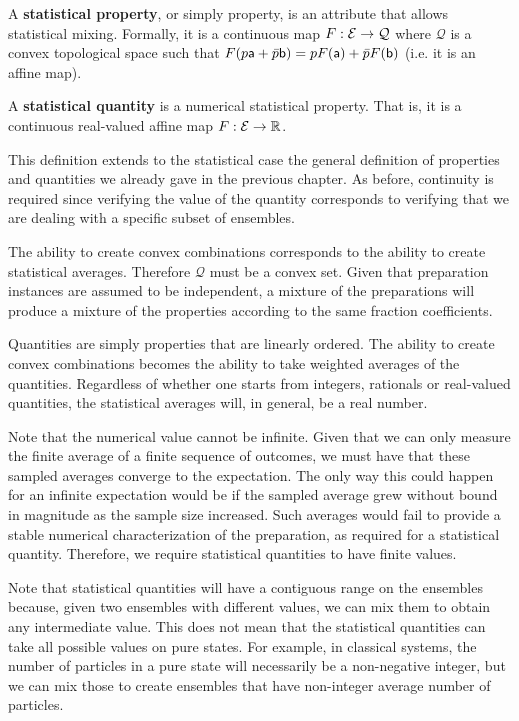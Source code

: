 \begin{mathSection}
	
\begin{defn}
	A \textbf{statistical property}, or simply property, is an attribute that allows statistical mixing. Formally, it is a continuous map $F : \Ens \to \mathcal{Q}$ where $\mathcal{Q}$ is a convex topological space such that $F(p \ens[a] + \bar{p} \ens[b]) = p F(\ens[a]) + \bar{p} F(\ens[b])$ (i.e. it is an affine map).
	
	A \textbf{statistical quantity} is a numerical statistical property. That is, it is a continuous real-valued affine map $F : \Ens \to \mathbb{R}$.
\end{defn}

\begin{justification}
	This definition extends to the statistical case the general definition of properties and quantities we already gave in the previous chapter. As before, continuity is required since verifying the value of the quantity corresponds to verifying that we are dealing with a specific subset of ensembles.
	
	The ability to create convex combinations corresponds to the ability to create statistical averages. Therefore $\mathcal{Q}$ must be a convex set. Given that preparation instances are assumed to be independent, a mixture of the preparations will produce a mixture of the properties according to the same fraction coefficients.
	
	Quantities are simply properties that are linearly ordered. The ability to create convex combinations becomes the ability to take weighted averages of the quantities. Regardless of whether one starts from integers, rationals or real-valued quantities, the statistical averages will, in general, be a real number.
	
	Note that the numerical value cannot be infinite. Given that we can only measure the finite average of a finite sequence of outcomes, we must have that these sampled averages converge to the expectation. The only way this could happen for an infinite expectation would be if the sampled average grew without bound in magnitude as the sample size increased. Such averages would fail to provide a stable numerical characterization of the preparation, as required for a statistical quantity. Therefore, we require statistical quantities to have finite values.
\end{justification}

\begin{remark}
	Note that statistical quantities will have a contiguous range on the ensembles because, given two ensembles with different values, we can mix them to obtain any intermediate value. This does not mean that the statistical quantities can take all possible values on pure states. For example, in classical systems, the number of particles in a pure state will necessarily be a non-negative integer, but we can mix those to create ensembles that have non-integer average number of particles.
\end{remark}


\end{mathSection}
